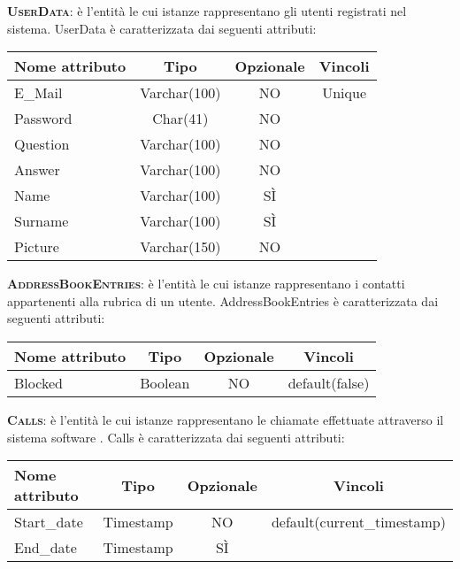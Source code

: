 \begin{description}
	\item{\scshape\bfseries UserData}: è l'entità le cui istanze rappresentano gli utenti registrati nel sistema. UserData è caratterizzata dai seguenti attributi:

\begin{center}
\begin{tabular}{lccc}
\toprule
Nome attributo & Tipo & Opzionale & Vincoli\\
\midrule
E\_Mail & Varchar(100) & NO & Unique\\
Password & Char(41) & NO &\\
Question & Varchar(100) & NO &\\
Answer & Varchar(100) & NO &\\
Name & Varchar(100) & SÌ &\\
Surname & Varchar(100) & SÌ &\\
Picture & Varchar(150) & NO &\\
\bottomrule
\end{tabular}
\end{center}

	\item{\scshape\bfseries AddressBookEntries}: è l'entità le cui istanze rappresentano i contatti appartenenti alla rubrica di un utente. AddressBookEntries è caratterizzata dai seguenti attributi:
	
\begin{center}
\begin{tabular}{lccc}
\toprule
Nome attributo & Tipo & Opzionale & Vincoli\\
\midrule
Blocked & Boolean & NO & default(false)\\
\bottomrule
\end{tabular}
\end{center}

	\item{\scshape\bfseries Calls}: è l'entità le cui istanze rappresentano le chiamate effettuate attraverso il sistema software \caName. Calls è caratterizzata dai seguenti attributi:

\begin{center}
\begin{tabular}{lccc}
\toprule
Nome attributo & Tipo & Opzionale & Vincoli\\
\midrule
Start\_date & Timestamp & NO & default(current\_timestamp)\\
End\_date & Timestamp & SÌ & \\
\bottomrule
\end{tabular}
\end{center}


\end{description}
